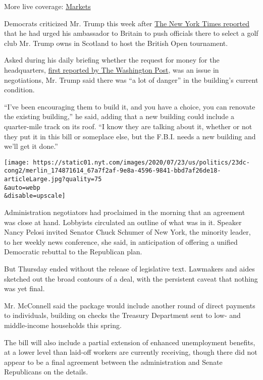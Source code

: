 More live coverage:
\href{https://www.nytimes.com/live/2020/08/03/business/stock-market-today-coronavirus?action=click\&pgtype=Article\&state=default\&region=MAIN_CONTENT_1\&context=storylines_live_updates}{Markets}

Democrats criticized Mr. Trump this week after
\href{https://www.nytimes.com/2020/07/21/world/europe/trump-british-open.html}{The
New York Times reported} that he had urged his ambassador to Britain to
push officials there to select a golf club Mr. Trump owns in Scotland to
host the British Open tournament.

Asked during his daily briefing whether the request for money for the
headquarters,
\href{https://www.washingtonpost.com/us-policy/2020/07/23/congress-stimulus-coronavirus-trump/?hpid=hp_hp-top-table-high_virushill-9am\%3Ahomepage\%2Fstory-ans}{first
reported by The Washington Post}, was an issue in negotiations, Mr.
Trump said there was ``a lot of danger'' in the building's current
condition.

``I've been encouraging them to build it, and you have a choice, you can
renovate the existing building,'' he said, adding that a new building
could include a quarter-mile track on its roof. ``I know they are
talking about it, whether or not they put it in this bill or someplace
else, but the F.B.I. needs a new building and we'll get it done.''

\texttt{[image: https://static01.nyt.com/images/2020/07/23/us/politics/23dc-cong2/merlin\_174871614\_67a7f2af-9e8a-4596-9841-bbd7af26de18-articleLarge.jpg?quality=75\\\&auto=webp\\\&disable=upscale]}

Administration negotiators had proclaimed in the morning that an
agreement was close at hand. Lobbyists circulated an outline of what was
in it. Speaker Nancy Pelosi invited Senator Chuck Schumer of New York,
the minority leader, to her weekly news conference, she said, in
anticipation of offering a unified Democratic rebuttal to the Republican
plan.

But Thursday ended without the release of legislative text. Lawmakers
and aides sketched out the broad contours of a deal, with the persistent
caveat that nothing was yet final.

Mr. McConnell said the package would include another round of direct
payments to individuals, building on checks the Treasury Department sent
to low- and middle-income households this spring.

The bill will also include a partial extension of enhanced unemployment
benefits, at a lower level than laid-off workers are currently
receiving, though there did not appear to be a final agreement between
the administration and Senate Republicans on the details.

